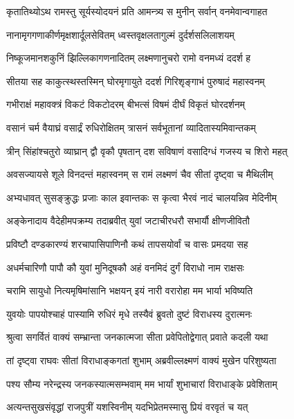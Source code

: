 
\twolineshloka
{कृतातिथ्योऽथ रामस्तु सूर्यस्योदयनं प्रति}
{आमन्त्र्य स मुनीन् सर्वान् वनमेवान्वगाहत} %

\twolineshloka
{नानामृगगणाकीर्णमृक्षशार्दूलसेवितम्}
{ध्वस्तवृक्षलतागुल्मं दुर्दर्शसलिलाशयम्} %

\twolineshloka
{निष्कूजमानशकुनिं झिल्लिकागणनादितम्}
{लक्ष्मणानुचरो रामो वनमध्यं ददर्श ह} %

\twolineshloka
{सीतया सह काकुत्स्थस्तस्मिन् घोरमृगायुते}
{ददर्श गिरिशृङ्गाभं पुरुषादं महास्वनम्} %

\twolineshloka
{गभीराक्षं महावक्त्रं विकटं विकटोदरम्}
{बीभत्सं विषमं दीर्घं विकृतं घोरदर्शनम्} %

\twolineshloka
{वसानं चर्म वैयाघ्रं वसार्द्रं रुधिरोक्षितम्}
{त्रासनं सर्वभूतानां व्यादितास्यमिवान्तकम्} %

\twolineshloka
{त्रीन् सिंहांश्चतुरो व्याघ्रान् द्वौ वृकौ पृषतान् दश}
{सविषाणं वसादिग्धं गजस्य च शिरो महत्} %

\twolineshloka
{अवसज्यायसे शूले विनदन्तं महास्वनम्}
{स रामं लक्ष्मणं चैव सीतां दृष्ट्वा च मैथिलीम्} %

\onelineshloka
{अभ्यधावत् सुसङ्क्रुद्धः प्रजाः काल इवान्तकः स कृत्वा भैरवं नादं चालयन्निव मेदिनीम्} %

\twolineshloka
{अङ्केनादाय वैदेहीमपक्रम्य तदाब्रवीत्}
{युवां जटाचीरधरौ सभार्यौ क्षीणजीवितौ} %

\twolineshloka
{प्रविष्टौ दण्डकारण्यं शरचापासिपाणिनौ}
{कथं तापसयोर्वां च वासः प्रमदया सह} %

\twolineshloka
{अधर्मचारिणौ पापौ कौ युवां मुनिदूषकौ}
{अहं वनमिदं दुर्गं विराधो नाम राक्षसः} %

\twolineshloka
{चरामि सायुधो नित्यमृषिमांसानि भक्षयन्}
{इयं नारी वरारोहा मम भार्या भविष्यति} %

\twolineshloka
{युवयोः पापयोश्चाहं पास्यामि रुधिरं मृधे}
{तस्यैवं ब्रुवतो दुष्टं विराधस्य दुरात्मनः} %

\twolineshloka
{श्रुत्वा सगर्वितं वाक्यं सम्भ्रान्ता जनकात्मजा}
{सीता प्रवेपितोद्वेगात् प्रवाते कदली यथा} %

\twolineshloka
{तां दृष्ट्वा राघवः सीतां विराधाङ्कगतां शुभाम्}
{अब्रवील्लक्ष्मणं वाक्यं मुखेन परिशुष्यता} %

\twolineshloka
{पश्य सौम्य नरेन्द्रस्य जनकस्यात्मसम्भवाम्}
{मम भार्यां शुभाचारां विराधाङ्के प्रवेशिताम्} %

\twolineshloka
{अत्यन्तसुखसंवृद्धां राजपुत्रीं यशस्विनीम्}
{यदभिप्रेतमस्मासु प्रियं वरवृतं च यत्} %

